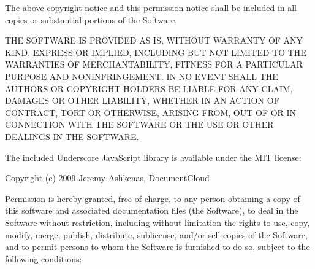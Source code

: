 \documentclass[letterpaper,10pt,english]{sphinxmanual}
\begin{document}
\begin{sphinxVerbatim}[commandchars=\\\{\}]
The above copyright notice and this permission notice shall be
included in all copies or substantial portions of the Software.

THE SOFTWARE IS PROVIDED \PYGZdq{}AS IS\PYGZdq{}, WITHOUT WARRANTY OF ANY KIND,
EXPRESS OR IMPLIED, INCLUDING BUT NOT LIMITED TO THE WARRANTIES OF
MERCHANTABILITY, FITNESS FOR A PARTICULAR PURPOSE AND
NONINFRINGEMENT. IN NO EVENT SHALL THE AUTHORS OR COPYRIGHT HOLDERS BE
LIABLE FOR ANY CLAIM, DAMAGES OR OTHER LIABILITY, WHETHER IN AN ACTION
OF CONTRACT, TORT OR OTHERWISE, ARISING FROM, OUT OF OR IN CONNECTION
WITH THE SOFTWARE OR THE USE OR OTHER DEALINGS IN THE SOFTWARE.
\PYGZhy{}\PYGZhy{}\PYGZhy{}\PYGZhy{}\PYGZhy{}\PYGZhy{}\PYGZhy{}\PYGZhy{}\PYGZhy{}\PYGZhy{}\PYGZhy{}\PYGZhy{}\PYGZhy{}\PYGZhy{}\PYGZhy{}\PYGZhy{}\PYGZhy{}\PYGZhy{}\PYGZhy{}\PYGZhy{}\PYGZhy{}\PYGZhy{}\PYGZhy{}\PYGZhy{}\PYGZhy{}\PYGZhy{}\PYGZhy{}\PYGZhy{}\PYGZhy{}\PYGZhy{}\PYGZhy{}\PYGZhy{}\PYGZhy{}\PYGZhy{}\PYGZhy{}\PYGZhy{}\PYGZhy{}\PYGZhy{}\PYGZhy{}\PYGZhy{}\PYGZhy{}\PYGZhy{}\PYGZhy{}\PYGZhy{}\PYGZhy{}\PYGZhy{}\PYGZhy{}\PYGZhy{}\PYGZhy{}\PYGZhy{}\PYGZhy{}\PYGZhy{}\PYGZhy{}\PYGZhy{}\PYGZhy{}\PYGZhy{}\PYGZhy{}\PYGZhy{}\PYGZhy{}\PYGZhy{}\PYGZhy{}\PYGZhy{}\PYGZhy{}\PYGZhy{}\PYGZhy{}\PYGZhy{}\PYGZhy{}\PYGZhy{}\PYGZhy{}\PYGZhy{}

The included Underscore JavaScript library is available under the MIT
license:

\PYGZhy{}\PYGZhy{}\PYGZhy{}\PYGZhy{}\PYGZhy{}\PYGZhy{}\PYGZhy{}\PYGZhy{}\PYGZhy{}\PYGZhy{}\PYGZhy{}\PYGZhy{}\PYGZhy{}\PYGZhy{}\PYGZhy{}\PYGZhy{}\PYGZhy{}\PYGZhy{}\PYGZhy{}\PYGZhy{}\PYGZhy{}\PYGZhy{}\PYGZhy{}\PYGZhy{}\PYGZhy{}\PYGZhy{}\PYGZhy{}\PYGZhy{}\PYGZhy{}\PYGZhy{}\PYGZhy{}\PYGZhy{}\PYGZhy{}\PYGZhy{}\PYGZhy{}\PYGZhy{}\PYGZhy{}\PYGZhy{}\PYGZhy{}\PYGZhy{}\PYGZhy{}\PYGZhy{}\PYGZhy{}\PYGZhy{}\PYGZhy{}\PYGZhy{}\PYGZhy{}\PYGZhy{}\PYGZhy{}\PYGZhy{}\PYGZhy{}\PYGZhy{}\PYGZhy{}\PYGZhy{}\PYGZhy{}\PYGZhy{}\PYGZhy{}\PYGZhy{}\PYGZhy{}\PYGZhy{}\PYGZhy{}\PYGZhy{}\PYGZhy{}\PYGZhy{}\PYGZhy{}\PYGZhy{}\PYGZhy{}\PYGZhy{}\PYGZhy{}\PYGZhy{}
Copyright (c) 2009 Jeremy Ashkenas, DocumentCloud

Permission is hereby granted, free of charge, to any person
obtaining a copy of this software and associated documentation
files (the \PYGZdq{}Software\PYGZdq{}), to deal in the Software without
restriction, including without limitation the rights to use,
copy, modify, merge, publish, distribute, sublicense, and/or sell
copies of the Software, and to permit persons to whom the
Software is furnished to do so, subject to the following
conditions:


\end{sphinxVerbatim}
\end{document}
